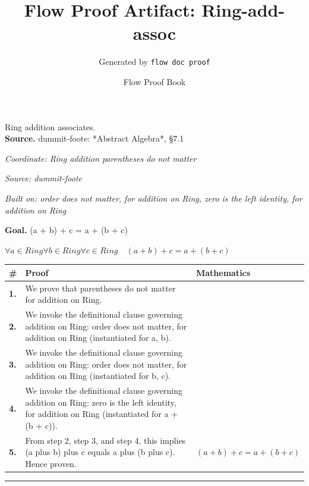 \documentclass[11pt]{article}
\title{Flow Proof Artifact: Ring-add-assoc}
\author{Generated by \texttt{flow doc proof}}
\date{Flow Proof Book}
\theoremstyle{definition}
\begin{document}
\maketitle
Ring addition associates.\\[0.5em]
\textbf{Source.} dummit-foote: *Abstract Algebra*, §7.1\\[0.5em]
\bigskip
{}\par
\smallskip\noindent\textit{Coordinate: Ring \cdot addition \cdot parentheses do not matter}\par
\smallskip\noindent\textit{Source: dummit-foote}\par
\smallskip\noindent\textit{Built on: order does not matter, for addition on Ring, zero is the left identity, for addition on Ring}\par
\medskip
\noindent\textbf{Goal.} (a + b) + c = a + (b + c)\par
\noindent$\displaystyle \forall a \in Ring \forall b \in Ring \forall c \in Ring\quad (a + b) + c = a + (b + c)$\par
\medskip
\noindent
\begin{tabular}{@{} >{\raggedright\arraybackslash}p{} >{\raggedright\arraybackslash}p{} >{\raggedleft\arraybackslash}p{} @{}}
\textbf{\#} & \textbf{Proof} & \textbf{Mathematics} \\
\midrule
\textbf{1.} & We prove that parentheses do not matter for addition on Ring. & \\[0.45em]
\textbf{2.} & We invoke the definitional clause governing addition on Ring: order does not matter, for addition on Ring (instantiated for a, b). & \\[0.45em]
\textbf{3.} & We invoke the definitional clause governing addition on Ring: order does not matter, for addition on Ring (instantiated for b, c). & \\[0.45em]
\textbf{4.} & We invoke the definitional clause governing addition on Ring: zero is the left identity, for addition on Ring (instantiated for a + (b + c)). & \\[0.45em]
\textbf{5.} & From step 2, step 3, and step 4, this implies (a plus b) plus c equals a plus (b plus c). Hence proven. & $\displaystyle (a + b) + c = a + (b + c)$ \\[0.45em]
\bottomrule
\end{tabular}
\label{thm:Ring-addition-parentheses_do_not_matter}
\par\medskip\hrule
\end{document}
